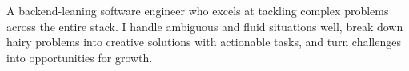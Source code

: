 A backend-leaning software engineer who excels at tackling complex problems across the entire stack.
I handle ambiguous and fluid situations well, break down hairy problems into creative solutions with actionable tasks,
and turn challenges into opportunities for growth.
